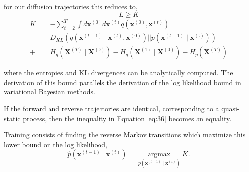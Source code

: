 for our diffusion trajectories this reduces to,
\begin{equation}
  \label{eq:36}
L  \geq K 
\end{equation}
\begin{equation}
  \label{eq:39}
  \begin{aligned}
K= & -\sum_{t=2}^T \int d \mathbf{x}^{(0)} d \mathbf{x}^{(t)} q\left(\mathbf{x}^{(0)}, \mathbf{x}^{(t)}\right) \\
& D_{K L}\left(q\left(\mathbf{x}^{(t-1)} \mid \mathbf{x}^{(t)}, \mathbf{x}^{(0)}\right)|| p\left(\mathbf{x}^{(t-1)} \mid \mathbf{x}^{(t)}\right)\right) \\
+ & H_q\left(\mathbf{X}^{(T)} \mid \mathbf{X}^{(0)}\right)-H_q\left(\mathbf{X}^{(1)} \mid \mathbf{X}^{(0)}\right)-H_p\left(\mathbf{X}^{(T)}\right)
  \end{aligned}
\end{equation}

where the entropies and KL divergences can be analytically computed. The derivation of this bound parallels the derivation of the log likelihood bound in variational Bayesian methods.

If the forward and reverse trajectories are identical, corresponding to a quasi-static process, then the inequality in Equation \ref{eq:36} becomes an equality.

Training consists of finding the reverse Markov transitions which maximize this lower bound on the log likelihood,
\begin{equation}
  \label{eq:38}
\hat{p}\left(\mathbf{x}^{(t-1)} \mid \mathbf{x}^{(t)}\right)=\underset{p\left(\mathbf{x}^{(t-1)} \mid \mathbf{x}^{(t)}\right)}{\operatorname{argmax}} K .  
\end{equation}



